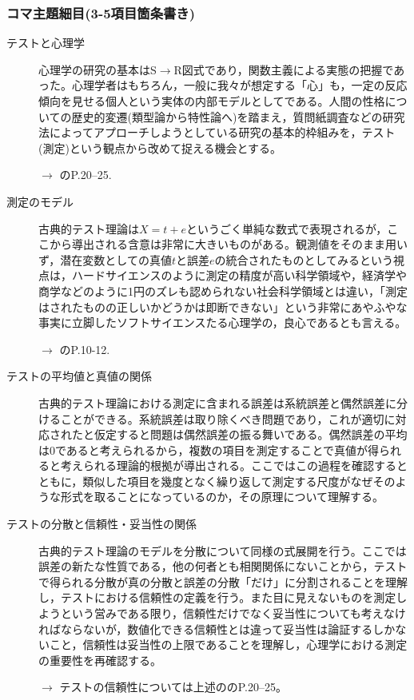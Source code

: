 \subsubsection{コマ主題細目(3-5項目箇条書き)}
\begin{description}
	\item[テストと心理学]心理学の研究の基本はS$\to$R図式であり，関数主義による実態の把握であった。心理学者はもちろん，一般に我々が想定する「心」も，一定の反応傾向を見せる個人という実体の内部モデルとしてである。人間の性格についての歴史的変遷(類型論から特性論へ)を踏まえ，質問紙調査などの研究法によってアプローチしようとしている研究の基本的枠組みを，テスト(測定)という観点から改めて捉える機会とする。
	      \begin{flushright}
		      $\to$ \citet{kosugi2016b}のP.20--25.
	      \end{flushright}

	\item[測定のモデル]古典的テスト理論は$X=t+e$というごく単純な数式で表現されるが，ここから導出される含意は非常に大きいものがある。観測値をそのまま用いず，潜在変数としての真値$t$と誤差$e$の統合されたものとしてみるという視点は，ハードサイエンスのように測定の精度が高い科学領域や，経済学や商学などのように1円のズレも認められない社会科学領域とは違い，「測定はされたものの正しいかどうかは即断できない」という非常にあやふやな事実に立脚したソフトサイエンスたる心理学の，良心であるとも言える。
	      \begin{flushright}
		      $\to$ \citet{Kumagai201508}のP.10-12.
	      \end{flushright}

	\item[テストの平均値と真値の関係]古典的テスト理論における測定に含まれる誤差は系統誤差と偶然誤差に分けることができる。系統誤差は取り除くべき問題であり，これが適切に対応されたと仮定すると問題は偶然誤差の振る舞いである。偶然誤差の平均は0であると考えられるから，複数の項目を測定することで真値が得られると考えられる理論的根拠が導出される。ここではこの過程を確認するとともに，類似した項目を幾度となく繰り返して測定する尺度がなぜそのような形式を取ることになっているのか，その原理について理解する。

	\item[テストの分散と信頼性・妥当性の関係]古典的テスト理論のモデルを分散について同様の式展開を行う。ここでは誤差の新たな性質である，他の何者とも相関関係にないことから，テストで得られる分散が真の分散と誤差の分散「だけ」に分割されることを理解し，テストにおける信頼性の定義を行う。また目に見えないものを測定しようという営みである限り，信頼性だけでなく妥当性についても考えなければならないが，数値化できる信頼性とは違って妥当性は論証するしかないこと，信頼性は妥当性の上限であることを理解し，心理学における測定の重要性を再確認する。
	      \begin{flushright}
		      $\to$ テストの信頼性については上述の\citet{kosugi2016b}のP.20--25。
	      \end{flushright}

\end{description}
